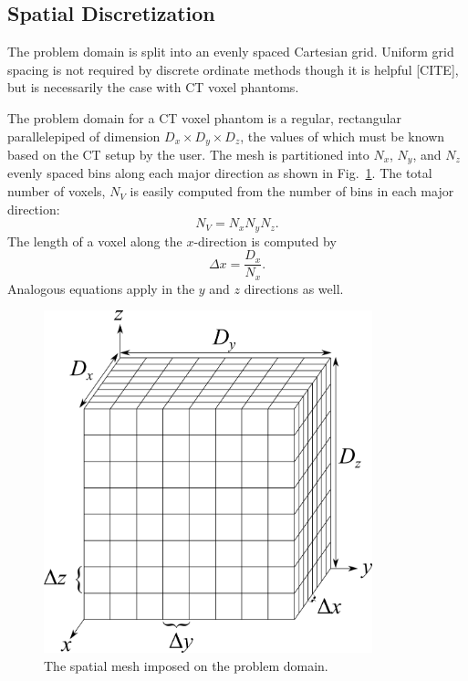 \subsection{Spatial Discretization}

The problem domain is split into an evenly spaced Cartesian grid. Uniform grid spacing is not required by discrete ordinate methods though it is helpful [CITE], but is necessarily the case with CT voxel phantoms.

The problem domain for a CT voxel phantom is a regular, rectangular parallelepiped of dimension $D_x \times D_y \times D_z$, the values of which must be known based on the CT setup by the user. The mesh is partitioned into $N_x$, $N_y$, and $N_z$ evenly spaced bins along each major direction as shown in Fig.~\ref{fig:spatial_disc}. The total number of voxels, $N_V$ is easily computed from the number of bins in each major direction:
\begin{equation} \label{eq:n_v}
N_V = N_x N_y N_z.
\end{equation}
The length of a voxel along the $x$-direction is computed by 
\begin{equation} \label{eq:mesh_x}
\Delta x = \frac{D_x}{N_x}.
\end{equation}
Analogous equations apply in the $y$ and $z$ directions as well.

\begin{figure}[tb]
  \begin{center}
   \includegraphics[width=3.75in]{figs/spatial_disc}
  \end{center}
  \caption{The spatial mesh imposed on the problem domain.}
\label{fig:spatial_disc}
\end{figure}


